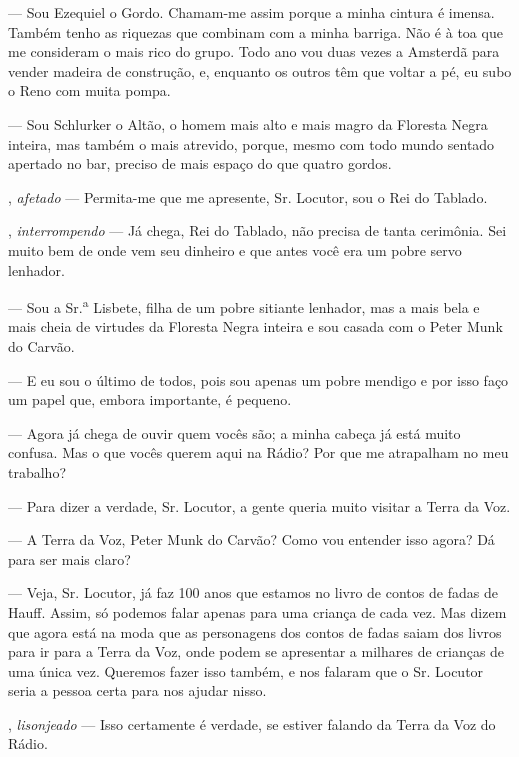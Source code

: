 \begin{myparindent}{0pt}
\begin{Parskip}
 --- Sou Ezequiel o Gordo. Chamam-me assim porque a minha cintura
é imensa. Também tenho as riquezas que combinam com a minha barriga. Não
é à toa que me consideram o mais rico do grupo. Todo ano vou duas vezes
a Amsterdã para vender madeira de construção, e, enquanto os outros têm
que voltar a pé, eu subo o Reno com muita pompa.

 --- Sou Schlurker o Altão, o homem mais alto e mais magro da
Floresta Negra inteira, mas também o mais atrevido, porque, mesmo com
todo mundo sentado apertado no bar, preciso de mais espaço do que quatro
gordos.

, \emph{afetado} --- Permita-me que me apresente, Sr.
Locutor, sou o Rei do Tablado.

, \emph{interrompendo} --- Já chega, Rei do Tablado, não
precisa de tanta cerimônia. Sei muito bem de onde vem seu dinheiro e que
antes você era um pobre servo lenhador.

 --- Sou a Sr.\textsuperscript{a} Lisbete, filha de um pobre
sitiante lenhador, mas a mais bela e mais cheia de virtudes da Floresta
Negra inteira e sou casada com o Peter Munk do Carvão.

 --- E eu sou o último de todos, pois sou apenas um pobre mendigo
e por isso faço um papel que, embora importante, é pequeno.

 --- Agora já chega de ouvir quem vocês são; a minha cabeça já
está muito confusa. Mas o que vocês querem aqui na Rádio? Por que me
atrapalham no meu trabalho?

 --- Para dizer a verdade, Sr. Locutor, a gente
queria muito visitar a Terra da Voz.

 --- A Terra da Voz, Peter Munk do Carvão? Como vou entender isso
agora? Dá para ser mais claro?

 --- Veja, Sr. Locutor, já faz 100 anos que estamos
no livro de contos de fadas de Hauff. Assim, só podemos falar apenas
para uma criança de cada vez. Mas dizem que agora está na moda que as
personagens dos contos de fadas saiam dos livros para ir para a Terra da
Voz, onde podem se apresentar a milhares de crianças de uma única vez.
Queremos fazer isso também, e nos falaram que o Sr. Locutor seria a
pessoa certa para nos ajudar nisso.

, \emph{lisonjeado} --- Isso certamente é verdade, se estiver
falando da Terra da Voz do Rádio.


\end{Parskip}
\end{myparindent}
